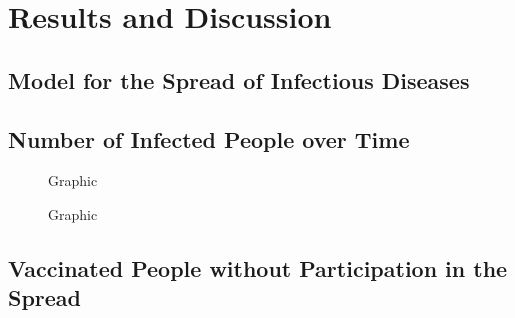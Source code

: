 \section{Results and Discussion}

\subsection{Model for the Spread of Infectious Diseases}

\subsection{Number of Infected People over Time}


\begin{figure}[ht]
    \centering
    \resizebox{\textwidth}{!}{}
    \caption{Graphic}\label{fig:Res_Dis_Avg_Inf_over_p1}
\end{figure}


\begin{figure}[ht]
    \centering
    \resizebox{\textwidth}{!}{}
    \caption{Graphic}\label{fig:Res_Dis_Avg_Inf_over_p1_L96}
\end{figure}

\subsection{Vaccinated People without Participation in the Spread}